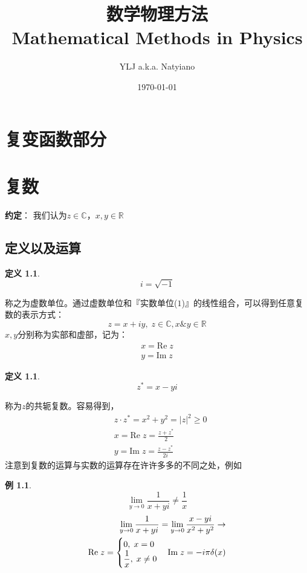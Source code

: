 \documentclass[10pt, a4paper, oneside]{ctexbook}
\title{{\Huge{\textbf{数学物理方法}}}\\Mathematical Methods in Physics}
\author{YLJ a.k.a. Natyiano}
\date{\today}
\newtheorem{definition}[theorem]{定义}
\newtheorem{example}[theorem]{例}
\begin{document}
\maketitle

\setcounter{page}{1}
\newpage
{}
\setcounter{page}{1}
\tableofcontents
\newpage
\setcounter{page}{1}

\chapter*{复变函数部分}
\chapter{复数}
\textbf{约定}：
我们认为$z\in \mathbb{C}$，$x,y \in \mathbb{R}$
\section{定义以及运算}

\begin{definition}
    $$i=\sqrt{-1}$$
\end{definition}
称之为虚数单位。通过虚数单位和『实数单位($1$)』的线性组合，可以得到任意复数的表示方式：
$$z=x+iy,\;z\in \mathbb{C}, x\&y \in \mathbb{R}$$
$x,y$分别称为实部和虚部，记为：
\begin{align*}
    x=\text{Re}\;z \\y=\text{Im}\;z
\end{align*}
\begin{definition}
    $$z^*=x-yi$$
\end{definition}
称为$z$的共轭复数。容易得到，
\begin{align*}
     & z\cdot z^*=x^2+y^2=|z|^2 \ge 0  \\
     & x=\text{Re}\;z=\frac{z+z^*}{2}  \\
     & y=\text{Im}\;z=\frac{z-z^*}{2i}
\end{align*}
注意到复数的运算与实数的运算存在许许多多的不同之处，例如
\begin{example}
    $$\lim_{y\to0}\frac{1}{x+yi}\ne \frac{1}{x}$$
    \begin{align*}
        \lim_{y\to0}\frac{1}{x+yi}=\lim_{y\to0}\frac{x-yi}{x^2+y^2}\to \\ \text{\rm Re} \;z= \begin{cases}
            0,\;x=0 \\\displaystyle \frac{1}{x},\; x\ne 0
        \end{cases}\text{\rm Im} \;z= -i\pi \delta(x)
    \end{align*}
\end{example}
\end{document}

